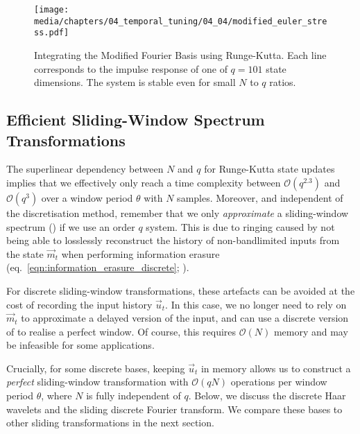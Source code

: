 \begin{figure}
	\texttt{[image: media/chapters/04\_temporal\_tuning/04\_04/modified\_euler\_stress.pdf]}%
	\caption[Integrating the Modified Fourier Basis using Runge-Kutta]{Integrating the Modified Fourier Basis using Runge-Kutta.
	Each line corresponds to the impulse response of one of $q = 101$ state dimensions. The system is stable even for small $N$ to $q$ ratios.
	}
	\label{fig:modified_euler_stress}
\end{figure}

\subsection{Efficient Sliding-Window Spectrum Transformations}
\label{sec:efficient_sliding_window}

The superlinear dependency between $N$ and $q$ for Runge-Kutta state updates implies that we effectively only reach a time complexity between $\mathcal{O}(q^{2.3})$ and $\mathcal{O}(q^3)$ over a window period $\theta$ with $N$ samples.
Moreover, and independent of the discretisation method, remember that we only \emph{approximate} a sliding-window spectrum () if we use an order $q$ \LTI system.
This is due to ringing caused by not being able to losslessly reconstruct the history of non-bandlimited inputs from the state $\vec m_t$ when performing information erasure (eq.~\ref{eqn:information_erasure_discrete}; ).

For discrete sliding-window transformations, these artefacts can be avoided at the cost of recording the input history $\vec u_t$.
In this case, we no longer need to rely on $\vec m_t$ to approximate a delayed version of the input, and can use a discrete version of  to realise a perfect window.
Of course, this requires $\mathcal{O}(N)$ memory and may be infeasible for some applications.

Crucially, for some discrete bases, keeping $\vec u_t$ in memory allows us to construct a \emph{perfect} sliding-window transformation with $\mathcal{O}(qN)$ operations per window period $\theta$, where $N$ is fully independent of $q$.
Below, we discuss the discrete Haar wavelets and the sliding discrete Fourier transform.
We compare these bases to other sliding transformations in the next section.

